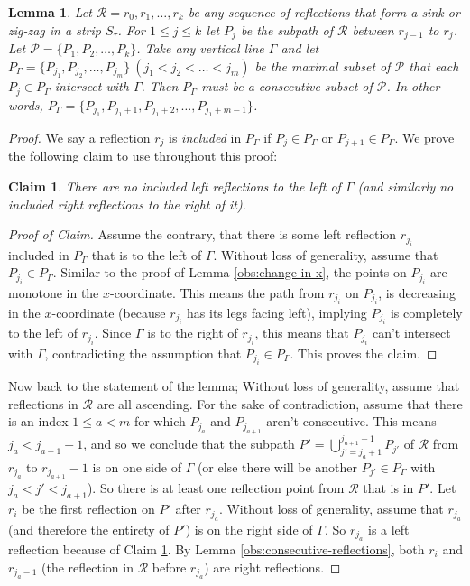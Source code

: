 \documentclass[10pt,a4paper]{amsart}
\theoremstyle{thmstyleone}
\newtheorem{lemma}{Lemma}
\newtheorem{claim}{Claim} %
\begin{document}
\begin{lemma}\label{lemma:consecutive-reflection-shadow}
    Let $\mathcal R = r_0, r_1,\dots, r_k$ be any sequence of reflections that form a sink or zig-zag in a strip $S_\tau$. For $1\le j \le k$ let $P_j$ be the subpath of $\mathcal R$ between $r_{j - 1}$ to $r_{j}$. Let $ \mathcal P = \{P_1, P_2,\dots, P_k\} $. Take any vertical line $\Gamma$ and let $P_\Gamma = \{P_{j_1}, P_{j_2},\dots, P_{j_m}\}\ (j_1< j_2< \dots < j_m)$ be the maximal subset of $\mathcal P$ that each $ P_j\in P_\Gamma $ intersect with $\Gamma$. Then $P_\Gamma$ must be a consecutive subset of $\mathcal P$. In other words, $P_\Gamma = \{P_{j_1}, P_{j_1 + 1}, P_{j_1 + 2},\dots, P_{j_1 + m - 1}\}$.
\end{lemma}
\begin{proof} 
    We say a reflection $r_j$ is {\em included} in $P_\Gamma$ if $P_j\in P_\Gamma$ or $P_{j + 1}\in P_\Gamma$. 
    We prove the following claim to use throughout this proof:
    \begin{claim}\label{claim:included-reflections}
    	There are no included left reflections to the left of $\Gamma$ (and similarly no included right reflections to the right of it). 
    \end{claim}
    \begin{proof}[Proof of Claim]
    	Assume the contrary, that there is some left reflection $r_{j_i}$ included in $P_\Gamma$ that is to the left of $\Gamma$. Without loss of generality, assume that $P_{j_i}\in P_\Gamma$. Similar to the proof of Lemma \ref{obs:change-in-x}, the points on $P_{j_i}$ are monotone in the $x$-coordinate. This means the path from $r_{j_i}$ on $P_{j_i}$, is decreasing in the $x$-coordinate (because $r_{j_i}$ has its legs facing left), implying $P_{j_i}$ is completely to the left of $r_{j_i}$. Since $\Gamma$ is to the right of $r_{j_i}$, this means that $P_{j_i}$ can't intersect with $\Gamma$, contradicting the assumption that $P_{j_i}\in P_\Gamma$. This proves the claim.
	\end{proof}
	
    Now back to the statement of the lemma;
    Without loss of generality, assume that reflections in $\mathcal R$ are all ascending. 
    For the sake of contradiction, assume that there is an index $1\le a < m$ for which $P_{j_a}$ and $P_{j_{a+1}}$ aren't consecutive. This means $j_a < j_{a + 1} - 1$, and so we conclude that the subpath $P' = \bigcup_{j' = j_a + 1}^{j_{a + 1} - 1}P_{j'}$ of $\mathcal R$ from $r_{j_a}$ to $r_{j_{a+1}} - 1$
    is on one side of $\Gamma$ (or else there will be another $P_{j'}\in P_\Gamma$ with $j_a < j' < j_{a+1}$). So there is at least one reflection point from $\mathcal R$ that is in $P'$. Let $r_{i}$ be the first reflection on $P'$ after $r_{j_a}$.
    Without loss of generality, assume that $r_{j_a}$ (and therefore the entirety of $P'$) is on the right side of $\Gamma$. So $r_{j_a}$ is a left reflection because of Claim \ref{claim:included-reflections}. 
    By Lemma \ref{obs:consecutive-reflections}, both $r_{i}$ and $r_{j_a - 1}$ (the reflection in $\mathcal R$ before $r_{j_a}$) are right reflections. 
    

\end{proof}
\end{document}
